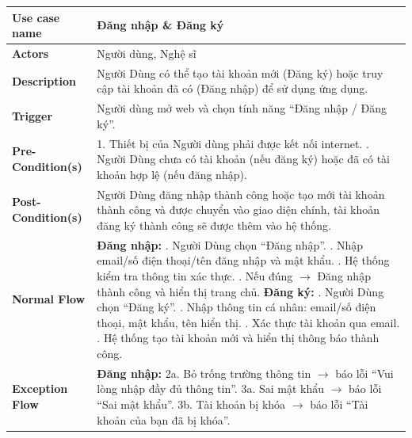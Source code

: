 \documentclass[a4paper]{article}
\begin{document}
\begin{table}[h!]
\centering
\renewcommand{\arraystretch}{1.3} %
\begin{tabularx}{\textwidth}{|l|X|}
\hline
\textbf{Use case name} & Đăng nhập \& Đăng ký \\ \hline
\textbf{Actors}        & Người dùng, Nghệ sĩ \\ \hline
\textbf{Description}   & Người Dùng có thể tạo tài khoản mới (Đăng ký) hoặc truy cập tài khoản đã có (Đăng nhập) để sử dụng ứng dụng. \\ \hline
\textbf{Trigger}       & Người dùng mở web và chọn tính năng “Đăng nhập / Đăng ký”. \\ \hline
\textbf{Pre-Condition(s)} 
& 1. Thiết bị của Người dùng phải được kết nối internet. \newline
  2. Người Dùng chưa có tài khoản (nếu đăng ký) hoặc đã có tài khoản hợp lệ (nếu đăng nhập). \\ \hline
\textbf{Post-Condition(s)} 
& Người Dùng đăng nhập thành công hoặc tạo mới tài khoản thành công và được chuyển vào giao diện chính, tài khoản đăng ký thành công sẽ được thêm vào hệ thống. \\ \hline
\textbf{Normal Flow}   
& \textbf{Đăng nhập:} \newline
  1. Người Dùng chọn “Đăng nhập”. \newline
  2. Nhập email/số điện thoại/tên đăng nhập và mật khẩu. \newline
  3. Hệ thống kiểm tra thông tin xác thực. \newline
  4. Nếu đúng $\rightarrow$ Đăng nhập thành công và hiển thị trang chủ. \newline
  \textbf{Đăng ký:} \newline
  1. Người Dùng chọn “Đăng ký”. \newline
  2. Nhập thông tin cá nhân: email/số điện thoại, mật khẩu, tên hiển thị. \newline
  3. Xác thực tài khoản qua email. \newline
  4. Hệ thống tạo tài khoản mới và hiển thị thông báo thành công. \\ \hline
\textbf{Exception Flow} 
& \textbf{Đăng nhập:} \newline
  2a. Bỏ trống trường thông tin $\rightarrow$ báo lỗi “Vui lòng nhập đầy đủ thông tin”. \newline
  3a. Sai mật khẩu $\rightarrow$ báo lỗi “Sai mật khẩu”. \newline
  3b. Tài khoản bị khóa $\rightarrow$ báo lỗi “Tài khoản của bạn đã bị khóa”.

\end{tabularx}
\end{table}
\end{document}
